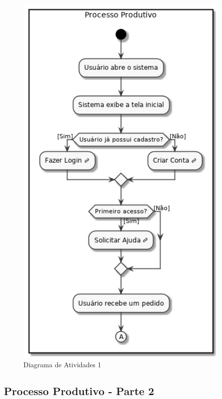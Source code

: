 \documentclass[rascunho,xindy,acronym,symbols]{fei}
\begin{document}
\begin{figure}[H]
    \centering
    \includegraphics[scale=0.6, width=300pt]{./Images/DA_Processo_Produtivo.png}
    \caption{Diagrama de Atividades 1}
    \label{fig:diag_atv1}
\end{figure}

\subsection{Processo Produtivo - Parte 2}
\end{document}

